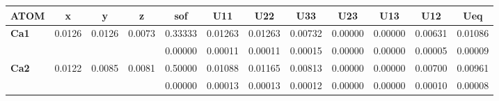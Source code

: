 \documentclass[]{scrartcl}
\begin{document}
	\begin{table}[]
		\centering
		
		\setlength\tabcolsep{2pt}
	\begin{tabular}{|l|l|l|l|l|l|l|l|l|l|l|l|}
		\hline
		\multicolumn{1}{|c|}{\textbf{ATOM}} & \multicolumn{1}{c|}{\textbf{x}} & \multicolumn{1}{c|}{\textbf{y}} & \multicolumn{1}{c|}{\textbf{z}} & \multicolumn{1}{c|}{\textbf{sof}} & \multicolumn{1}{c|}{\textbf{U11}} & \multicolumn{1}{c|}{\textbf{U22}} & \multicolumn{1}{c|}{\textbf{U33}} & \multicolumn{1}{c|}{\textbf{U23}} & \multicolumn{1}{c|}{\textbf{U13}} & \multicolumn{1}{c|}{\textbf{U12}} & \multicolumn{1}{c|}{\textbf{Ueq}} \\ \hline
		\textbf{Ca1}                        & 0.0126                          & 0.0126                          & 0.0073                          & 0.33333                           & 0.01263                           & 0.01263                           & 0.00732                           & 0.00000                           & 0.00000                           & 0.00631                           & 0.01086                           \\ \hline
		\textbf{}                           &                                 &                                 &                                 & 0.00000                           & 0.00011                           & 0.00011                           & 0.00015                           & 0.00000                           & 0.00000                           & 0.00005                           & 0.00009                           \\ \hline
		\textbf{Ca2}                        & 0.0122                          & 0.0085                          & 0.0081                          & 0.50000                           & 0.01088                           & 0.01165                           & 0.00813                           & 0.00000                           & 0.00000                           & 0.00700                           & 0.00961                           \\ \hline
		\textbf{}                           &                                 &                                 &                                 & 0.00000                           & 0.00013                           & 0.00013                           & 0.00012                           & 0.00000                           & 0.00000                           & 0.00010                           & 0.00008                           \\ \hline

\end{tabular}
\end{table}
\end{document}
